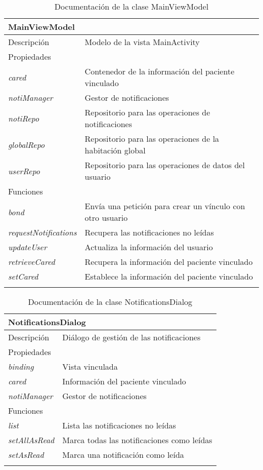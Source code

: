 \vspace{-20pt}
\begin{longtable}{|p{} p{}|}
    \hline
    \multicolumn{2}{|l|}{\textbf{MainViewModel}} \\ \hline \hline
    Descripción      & Modelo de la vista MainActivity \\ \hline
    \multicolumn{2}{|l|}{Propiedades} \\
    \emph{cared}  & Contenedor de la información del paciente vinculado  \\
    \emph{notiManager}  & Gestor de notificaciones  \\
    \emph{notiRepo}  & Repositorio para las operaciones de notificaciones  \\
    \emph{globalRepo}  & Repositorio para las operaciones de la habitación global  \\
    \emph{userRepo}  & Repositorio para las operaciones de datos del usuario  \\ \hline
    \multicolumn{2}{|l|}{Funciones} \\
    \emph{bond}  & Envía una petición para crear un vínculo con otro usuario \\
    \emph{requestNotifications}  & Recupera las notificaciones no leídas \\ 
    \emph{updateUser} & Actualiza la información del usuario \\
    \emph{retrieveCared}  & Recupera la información del paciente vinculado \\ 
    \emph{setCared}  & Establece la información del paciente vinculado \\ \hline
    \caption{Documentación de la clase MainViewModel}
    \label{dis:app:main_view_model}
\end{longtable}

\vspace{-31pt}
\begin{longtable}{|p{} p{}|}
    \hline
    \multicolumn{2}{|l|}{\textbf{NotificationsDialog}} \\ \hline \hline
    Descripción      & Diálogo de gestión de las notificaciones \\ \hline
    \multicolumn{2}{|l|}{Propiedades} \\
    \emph{binding}  & Vista vinculada  \\
    \emph{cared}  & Información del paciente vinculado  \\
    \emph{notiManager}  & Gestor de notificaciones  \\ \hline
    \multicolumn{2}{|l|}{Funciones} \\
    \emph{list}  & Lista las notificaciones no leídas \\
    \emph{setAllAsRead}  & Marca todas las notificaciones como leídas \\ 
    \emph{setAsRead}  & Marca una notificación como leída \\ \hline
    \caption{Documentación de la clase NotificationsDialog}
    \label{dis:app:notifications_dialog}
\end{longtable}

